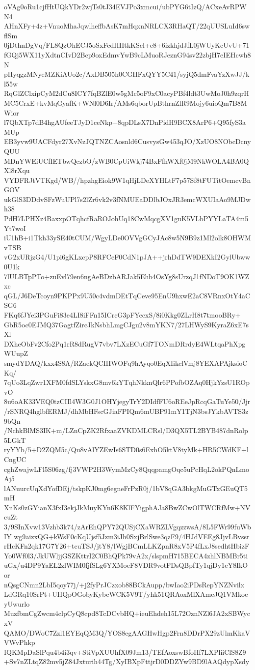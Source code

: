 oVAg0oRu1cjfHtUQkYDr2wjTs0tJ34EVJPo3xmcui/ubPYG6tIzQ/ACxeAvRPWN4
AHnXFy+4z+VnuoMhaJqwlheffbAsK7mHqxnNRLCX3RHaQT/22qUUSLuId6swflSm
0jDthnDgVq/FL8QzOhECJ5oSxFcdHIItkKScl+c8+6izkhjdJfL0jWUyKcUvU+71
fGQj5WX11yXdtnCIvD2Bcp9oxEdmvYwB9cLMuoRJeznG94sv22zbjH7eIEHcwh8N
pHyqgzMNyeMZKiAUo2c/AxDB505h0CGHFxQYY5C41/syjQ5dmFvaYzXwJJ/kl55w
RqGlZClxipCyM2dCu8ICY7fqBZlE0w5gMc5oF9xC0acyPBf4ldt3UwMoJ0h9zqrH
MC5CrxE+kvMqGyafK+WNl0D6Ir/AMs6qborUpBthrnZlR9Mojy6uioQm7B8MWior
l7QbXTp7dB4hgAUfeeTJyD1ceNkp+8qpDLsX7DnPidH9BCX8ArP6+Q95fyS3aMUp
EB3yvw9UACFdyr27XvNzJQTNZCAosnld6CusvysGw453qJO/XzUO8NObcDcnyQUU
MDnYWEiUCfIETbwQezbO/zWB0CpUiWkj74BxFfhWXf0jM9NkWOLA4BA0QXl8rXqu
VYDFRJtVTKgd/WB//hpzhgEiok9W1qHjLDeXYHLtF7p57Sf8tFUTitOemcvBnGOV
ukGlS3DDdvSFzWuUPl7s2lZr6vk2v3fNMUEaDDlbJOxJR3emcWXUIaAo9MJDwh38
PdH7LPHXz4BaxxpOTqhcfRaROJohUq18CwMqcgXV1guK5VLbPYYLaTA4m5Yt7woI
iU1hB+i1Tkh33ySE40tCUM/WgyLDe0OVVgGCyJAc8w5N9B9z1Ml2olk8OHWMvTSB
vG2xURjzG4/U1pi6gKLxcpP8RFCeF0CdN1pJA++jrhDdTW9DEXkI2GylUbww0U1k
7lULBTpPTo+zuEvl79en6ngAeBDzbARJak5Ehb4OsYg8sUrzqJ1fNDoT9OK1WZxc
qGL/J6DeTcoyn9PKPPx9U50c4vdmDEtTqCeve95EnU9hxwE2aC8VRnxOtY4aCSG6
FKq6fJYei3PGuFi83e4LI8iFFn15ICrcG3pFYecxS/8i0Kkg0ZLrH8t7tmooBRy+
GbR5oc0EJMQ37GagtfZircJkNsbhLmgCJgu2v8mYKN7/27LHWyS9KyraZ6xE7sXl
DXheObFv2Cfo2Pq1rR8dRugV7vbv7LXzECuGf7TONmDRrdyE4WLtqaPhXpgWUupZ
smydYDAQ/kxx4S8A/RZaekQCIHWOFq9hAyqo0EqXIikclVmj8YEXAPAjksioCKq/
7qUo3LqZwr1XFM0fdSLYskxG8mv6kYTqhNkknQlr6PPofbOZAq0HjkYzsU1ROpvO
8u6oAK33VEQ0tzCIIl4W3G0J1OHYjegyTrY2DIdfFU6oREeJpRcqGaTuYe50/Jjr
/rSNRQ4hglbfERMJ/dhMbHFscGJiaFPIQm6mUBP91mY1TjN3bsJYkbAVTS3z9bQn
/NchkBlMS3IK+m/LZnCpZK2RfxaaZVKDMLCRsl/D3QX5TL2BYB487dnRolp5LGkT
ryYYb/5+D2ZQM5c/Qu8vAlYZEwIs6STD0s6ExhO5ktV8tyMk+HR5CWdKF+lCngUC
cghZwajwLFl5S06zg/fj3VWP2H3WymMzCy8QqqpamgOqc5uPcHqL2okPQnLmoAj5
lANuurcUqXdYofDEj/tskpKJ0mg6egneFrPzR0j/1bV8qGA3bkgMuGTxGEuQT5mH
XnKs0zGYianX3fxI3ekjJkMuyKYn6K8KlFYigphAJa8BwZCwOlTWCRfMw+NVcuZt
3/9SInXvw13Vzhb3k74/zArEhQPY72QUSjCXaWRZLVgqzzwsA/8L5FWr99fuWbIY
wg9aizxQG+kWsF0cKqUjsf5Jzm3iJh0SxjBrlSwe3qzF9/4HJdVEEg8JjvLBvssr
rHcKFn2qk17G7Y26+tcuTSJ/jtY8/lWgjBCmLLKZpnR8xV5P4fLxJ8sedhtHbizF
Yo0Wf0l3/JkUWljjGSZKttrI2C0BhQPk79vA2x/slspmH715BECA4zhlNBMBr5ti
uGx/u4DP9YaEL2zlWIM0fjfSLg6YXMoeF8VDR9votFDsQBpfTy1qjDy1eY8IkOor
nQsgCNmn2LbI5qoy77j/+j2fyPrJCzxob88BCkAupp/bwIao2iPDsRepYNZNvilx
LdGRq10SrPt+UHQpOGobyKybcWCK5V9T/yhk51QRAoxMlXAmeJQ1VMkoeyUwurlo
MuzfbmCgZwcm4clpCyQ8cpd8TcDCvbHQ+ieuEhdeh15L72OznNZl6JA2xSBWycxV
QAMO/DWoC7Zzl1EYEqQM3Q/YOS8egAAGHwHgp2Frn8DDrPX29zUlmKkaVVWvPhkp
IQKMpDaSlPqu4b4i3qv+StiVpXUUhfX09Jm13/TEfAoxswBfoHf7LXPliiClS8Z9
+Sv7nZLtqZ82mv5jZ84Jxturih44Tg/XyIBXpFttjrD0DDZYw9BD9lAAQdypXsdy
